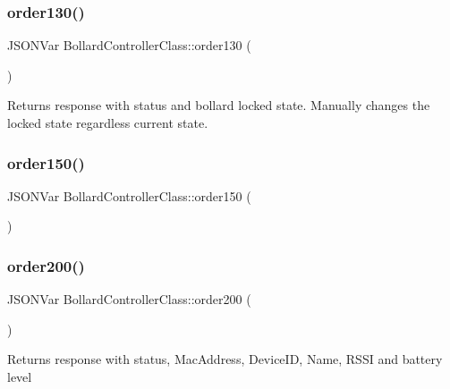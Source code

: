 \subsubsection{\texorpdfstring{order130()}{order130()}}
{\footnotesize\ttfamily J\+S\+O\+N\+Var Bollard\+Controller\+Class\+::order130 (\begin{DoxyParamCaption}{ }\end{DoxyParamCaption})\hspace{0.3cm}{\ttfamily [private]}}

Returns response with status and bollard locked state. Manually changes the locked state regardless current state. \mbox{\label{class_bollard_controller_class_a837c32c83b06ee43688222a30c6c2986}} 
\subsubsection{\texorpdfstring{order150()}{order150()}}
{\footnotesize\ttfamily J\+S\+O\+N\+Var Bollard\+Controller\+Class\+::order150 (\begin{DoxyParamCaption}{ }\end{DoxyParamCaption})\hspace{0.3cm}{\ttfamily [private]}}

\mbox{\label{class_bollard_controller_class_ac3d5d0d205c14f92ce259c72f3f6181e}} 
\subsubsection{\texorpdfstring{order200()}{order200()}}
{\footnotesize\ttfamily J\+S\+O\+N\+Var Bollard\+Controller\+Class\+::order200 (\begin{DoxyParamCaption}{ }\end{DoxyParamCaption})\hspace{0.3cm}{\ttfamily [private]}}

Returns response with status, Mac\+Address, Device\+ID, Name, R\+S\+SI and battery level \mbox{\label{class_bollard_controller_class_ac00390cae67911839fea54cca8fc271b}} 
